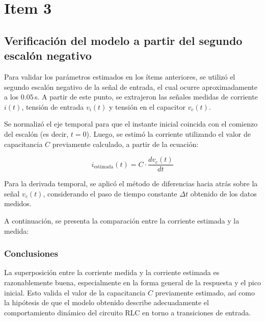 \documentclass{article}
\begin{document}
\section{Item 3}
\subsection*{Verificación del modelo a partir del segundo escalón negativo}

Para validar los parámetros estimados en los ítems anteriores, se utilizó el segundo escalón negativo de la señal de entrada, el cual ocurre aproximadamente a los $0.05\,$s. A partir de este punto, se extrajeron las señales medidas de corriente $i(t)$, tensión de entrada $v_i(t)$ y tensión en el capacitor $v_c(t)$.

Se normalizó el eje temporal para que el instante inicial coincida con el comienzo del escalón (es decir, $t=0$). Luego, se estimó la corriente utilizando el valor de capacitancia $C$ previamente calculado, a partir de la ecuación:

\[
i_{\text{estimada}}(t) = C \cdot \frac{d v_c(t)}{dt}
\]

Para la derivada temporal, se aplicó el método de diferencias hacia atrás sobre la señal $v_c(t)$, considerando el paso de tiempo constante $\Delta t$ obtenido de los datos medidos.

A continuación, se presenta la comparación entre la corriente estimada y la medida:


\subsubsection*{Conclusiones}

La superposición entre la corriente medida y la corriente estimada es razonablemente buena, especialmente en la forma general de la respuesta y el pico inicial. Esto valida el valor de la capacitancia $C$ previamente estimado, así como la hipótesis de que el modelo obtenido describe adecuadamente el comportamiento dinámico del circuito RLC en torno a transiciones de entrada.
\end{document}
